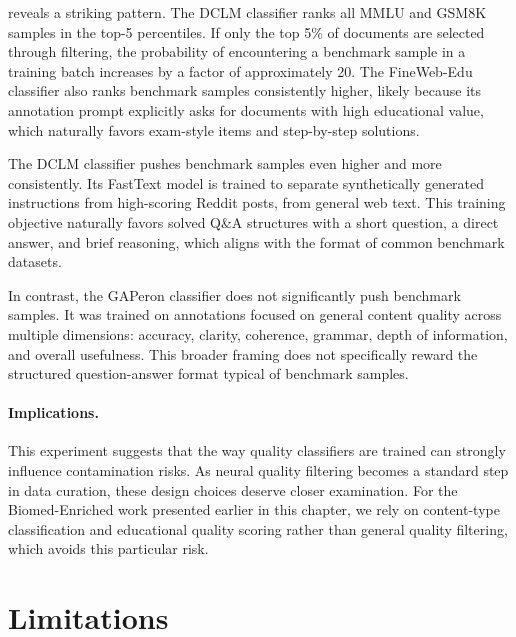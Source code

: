 \begin{reviewread}
 reveals a striking pattern. The DCLM classifier ranks all MMLU and GSM8K samples in the top-5 percentiles. If only the top 5\% of documents are selected through filtering, the probability of encountering a benchmark sample in a training batch increases by a factor of approximately 20. The FineWeb-Edu classifier also ranks benchmark samples consistently higher, likely because its annotation prompt explicitly asks for documents with high educational value, which naturally favors exam-style items and step-by-step solutions.
\end{reviewread}

\begin{reviewread}
The DCLM classifier pushes benchmark samples even higher and more consistently. Its FastText model is trained to separate synthetically generated instructions from high-scoring Reddit posts, from general web text. This training objective naturally favors solved Q\&A structures with a short question, a direct answer, and brief reasoning, which aligns with the format of common benchmark datasets.
\end{reviewread}

\begin{reviewread}
In contrast, the GAPeron classifier does not significantly push benchmark samples. It was trained on annotations focused on general content quality across multiple dimensions: accuracy, clarity, coherence, grammar, depth of information, and overall usefulness. This broader framing does not specifically reward the structured question-answer format typical of benchmark samples.
\end{reviewread}

\paragraph{Implications.} This experiment suggests that the way quality classifiers are trained can strongly influence contamination risks. As neural quality filtering becomes a standard step in data curation, these design choices deserve closer examination. For the Biomed-Enriched work presented earlier in this chapter, we rely on content-type classification and educational quality scoring rather than general quality filtering, which avoids this particular risk.


\section{Limitations}

